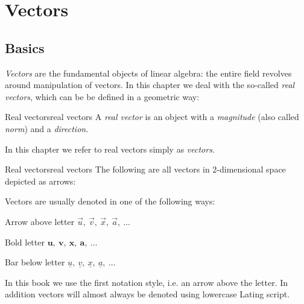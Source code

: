 \section{Vectors}
\subsection{Basics}
\emph{Vectors} are the fundamental objects of linear algebra: the entire field revolves around manipulation of vectors. In this chapter we deal with the so-called \emph{real vectors}, which can be be defined in a geometric way:

\begin{definition}{Real vectors}{real vectors}
	A \textit{real vector} is an object with a \emph{magnitude} (also called \emph{norm}) and a \emph{direction}.
\end{definition}

In this chapter we refer to real vectors simply as \textit{vectors}.

\begin{example}{Real vectors}{real vectors}
	The following are all vectors in 2-dimensional space depicted as arrows:
  
	\vspace{1em}
	\centering
\end{example}

Vectors are usually denoted in one of the following ways:

\begin{descitemize}
	\setlength\itemsep{1em}
	\addtolength{\itemindent}{5mm}
	\item[Arrow above letter] $\vec{u},\ \vec{v},\ \vec{x},\ \vec{a},\ \dots$
	\item[Bold letter] $\bm{u},\ \bm{v},\ \bm{x},\ \bm{a},\ \dots$
	\item[Bar below letter] $\underline{u},\ \underline{v},\ \underline{x},\ \underline{a},\ \dots$
\end{descitemize}

In this book we use the first notation style, i.e. an arrow above the letter. In addition vectors will almost always be denoted using lowercase Lating script.

